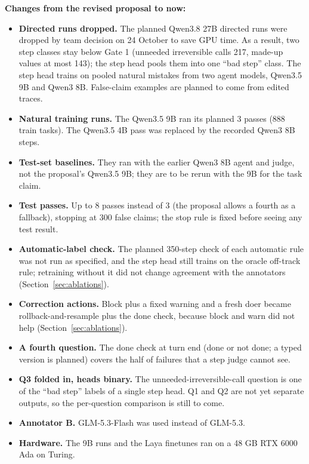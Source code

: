 \documentclass[10.5pt,a4paper]{article}
\begin{document}
\textbf{Changes from the revised proposal to now:}
\begin{itemize}
  \item \textbf{Directed runs dropped.} The planned Qwen3.8 27B directed runs were dropped by team decision on 24 October to save GPU time. As a result, two step classes stay below Gate 1 (unneeded irreversible calls 217, made-up values at most 143); the step head pools them into one ``bad step'' class. The step head trains on pooled natural mistakes from two agent models, Qwen3.5 9B and Qwen3 8B. False-claim examples are planned to come from edited traces.
  \item \textbf{Natural training runs.} The Qwen3.5 9B ran its planned 3 passes (888 train tasks). The Qwen3.5 4B pass was replaced by the recorded Qwen3 8B steps.
  \item \textbf{Test-set baselines.} They ran with the earlier Qwen3 8B agent and judge, not the proposal's Qwen3.5 9B; they are to be rerun with the 9B for the task claim.
  \item \textbf{Test passes.} Up to 8 passes instead of 3 (the proposal allows a fourth as a fallback), stopping at 300 false claims; the stop rule is fixed before seeing any test result.
  \item \textbf{Automatic-label check.} The planned 350-step check of each automatic rule was not run as specified, and the step head still trains on the oracle off-track rule; retraining without it did not change agreement with the annotators (Section~\ref{sec:ablations}).
  \item \textbf{Correction actions.} Block plus a fixed warning and a fresh doer became rollback-and-resample plus the done check, because block and warn did not help (Section~\ref{sec:ablations}).
  \item \textbf{A fourth question.} The done check at turn end (done or not done; a typed version is planned) covers the half of failures that a step judge cannot see.
  \item \textbf{Q3 folded in, heads binary.} The unneeded-irreversible-call question is one of the ``bad step'' labels of a single step head. Q1 and Q2 are not yet separate outputs, so the per-question comparison is still to come.
  \item \textbf{Annotator B.} GLM-5.3-Flash was used instead of GLM-5.3.
  \item \textbf{Hardware.} The 9B runs and the Laya finetunes ran on a 48 GB RTX 6000 Ada on Turing.
\end{itemize}
\end{document}
